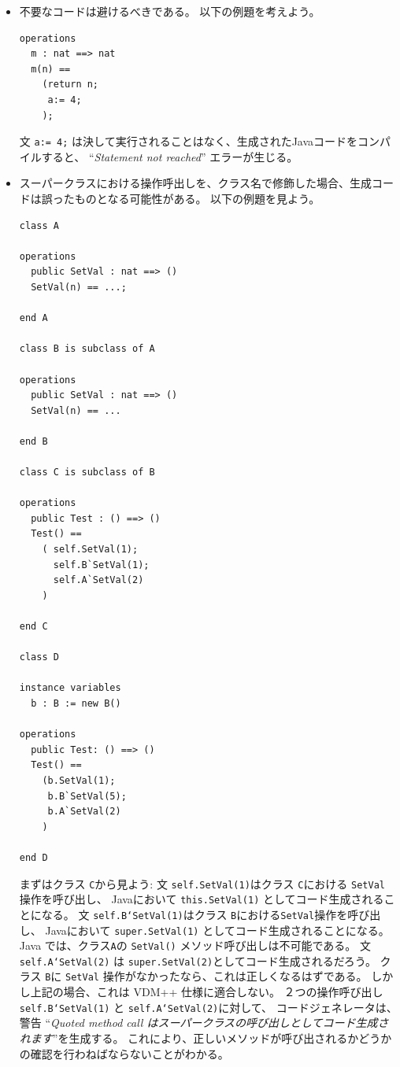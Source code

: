 \documentclass[\pformat,11pt]{jarticle}
\begin{document}
\begin{itemize}
\item 不要なコードは避けるべきである。 
以下の例題を考えよう。

\begin{screen}
\begin{small}
\begin{verbatim}
operations
  m : nat ==> nat
  m(n) ==
    (return n;
     a:= 4;
    );
\end{verbatim}
\end{small}
\end{screen}

文 {\tt a:= 4;} は決して実行されることはなく、生成されたJavaコードをコンパイルすると、
``{\em Statement not reached}'' エラーが生じる。

\item スーパークラスにおける操作呼出しを、クラス名で修飾した場合、生成コードは誤ったものとなる可能性がある。
以下の例題を見よう。

\begin{screen}
\begin{small}
\begin{verbatim}
class A

operations
  public SetVal : nat ==> ()
  SetVal(n) == ...;

end A

class B is subclass of A

operations
  public SetVal : nat ==> ()
  SetVal(n) == ...

end B

class C is subclass of B

operations
  public Test : () ==> ()
  Test() ==
    ( self.SetVal(1);
      self.B`SetVal(1);
      self.A`SetVal(2)
    )

end C

class D

instance variables
  b : B := new B()

operations
  public Test: () ==> ()
  Test() ==
    (b.SetVal(1);
     b.B`SetVal(5);
     b.A`SetVal(2)
    )

end D
\end{verbatim}
\end{small}
\end{screen}

まずはクラス {\tt C}から見よう: 
文 {\tt self.SetVal(1)}はクラス {\tt C}における {\tt SetVal} 操作を呼び出し、
Javaにおいて {\tt this.SetVal(1)} としてコード生成されることになる。
文 {\tt self.B`SetVal(1)}はクラス {\tt B}における{\tt SetVal}操作を呼び出し、
Javaにおいて {\tt super.SetVal(1)} としてコード生成されることになる。
Java では、クラス{\tt A}の {\tt SetVal()} メソッド呼び出しは不可能である。
文 {\tt self.A`SetVal(2)} は {\tt super.SetVal(2)}としてコード生成されるだろう。
クラス {\tt B}に {\tt SetVal} 操作がなかったなら、これは正しくなるはずである。
しかし上記の場合、これは VDM++ 仕様に適合しない。
２つの操作呼び出し {\tt self.B`SetVal(1)} と {\tt self.A`SetVal(2)}に対して、
コードジェネレータは、警告 ``{\em Quoted method call はスーパークラスの呼び出しとしてコード生成されます}''を生成する。
これにより、正しいメソッドが呼び出されるかどうかの確認を行わねばならないことがわかる。
  

\end{itemize}
\end{document}
